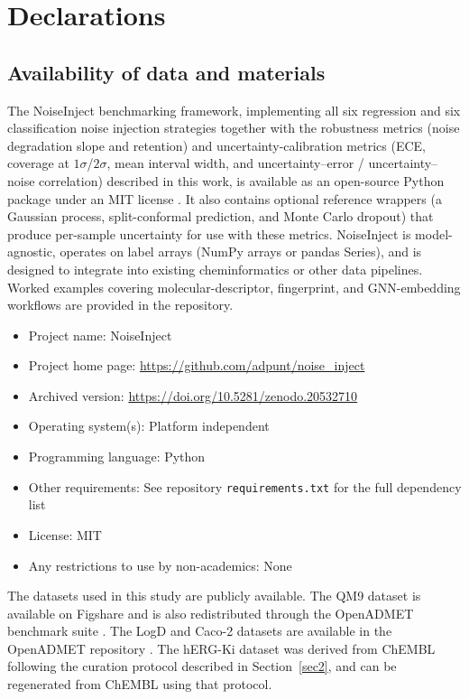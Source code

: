 \documentclass[pdflatex,sn-basic]{sn-jnl}%
\theoremstyle{thmstyleone}%
\theoremstyle{thmstyletwo}%
\theoremstyle{thmstylethree}%
\begin{document}
\section*{Declarations}

\subsection*{Availability of data and materials}

The NoiseInject benchmarking framework, implementing all six regression and six classification noise injection strategies together with the robustness metrics (noise degradation slope and retention) and uncertainty-calibration metrics (ECE, coverage at $1\sigma$/$2\sigma$, mean interval width, and uncertainty--error / uncertainty--noise correlation) described in this work, is available as an open-source Python package under an MIT license \citep{noiseinject}. It also contains optional reference wrappers (a Gaussian process, split-conformal prediction, and Monte Carlo dropout) that produce per-sample uncertainty for use with these metrics. NoiseInject is model-agnostic, operates on label arrays (NumPy arrays or pandas Series), and is designed to integrate into existing cheminformatics or other data pipelines. Worked examples covering molecular-descriptor, fingerprint, and GNN-embedding workflows are provided in the repository.

\begin{itemize}
    \item Project name: NoiseInject
    \item Project home page: \url{https://github.com/adpunt/noise_inject}
    \item Archived version: \url{https://doi.org/10.5281/zenodo.20532710}
    \item Operating system(s): Platform independent
    \item Programming language: Python
    \item Other requirements: See repository \texttt{requirements.txt} for the full dependency list
    \item License: MIT
    \item Any restrictions to use by non-academics: None
\end{itemize}

The datasets used in this study are publicly available. The QM9 dataset is available on Figshare \citep{qm9_dataset} and is also redistributed through the OpenADMET benchmark suite \citep{Ramakrishnan2014, openadmet}. The LogD and Caco-2 datasets are available in the OpenADMET repository \citep{openadmet}. The hERG-Ki dataset was derived from ChEMBL \citep{Zdrazil2023} following the curation protocol described in Section~\ref{sec2}, and can be regenerated from ChEMBL using that protocol.
\end{document}
